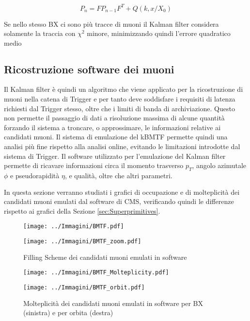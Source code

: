 \begin{equation}
  \label{eq:covariance}
  P_n = FP_{n-1}F^T + Q(k, x/X_0)
\end{equation}

Se nello stesso BX ci sono più tracce di muoni il Kalman filter considera solamente la traccia con $\chi^2$ minore, minimizzando quindi l'errore quadratico medio \cite{Summers:2728522}

\subsection{Ricostruzione software dei muoni}

Il Kalman filter è quindi un algoritmo che viene applicato per la ricostruzione di muoni nella catena di Trigger e per tanto deve soddisfare i requisiti di latenza richiesti dal Trigger stesso, oltre che i limiti di banda di archiviazione. Questo non permette il passaggio di dati a risoluzione massima di alcune quantità forzando il sistema a troncare, o approssimare, le informazioni relative ai candidati muoni. Il sistema di emulazione del kBMTF permette quindi una analisi più fine rispetto alla analisi online, evitando le limitazioni introdotte dal sistema di Trigger. Il software utilizzato per l'emulazione del Kalman filter permette di ricavare informazioni circa il momento trasverso $p_T$, angolo azimutale $\phi$ e pseudorapidità $\eta$, e qualità, oltre che altri parametri.

In questa sezione verranno studiati i grafici di occupazione e di molteplicità dei candidati muoni emulati dal software di CMS, verificando quindi le differenze rispetto ai grafici della Sezione \ref{sec:Superprimitives}.



\begin{figure}[t]
  \centering
  \begin{minipage}[b]{0.49\textwidth}
      \centering
      \texttt{[image: ../Immagini/BMTF.pdf]} 
    \end{minipage}
    \hfill 
    \begin{minipage}[b]{0.49\textwidth}
      \centering
      \texttt{[image: ../Immagini/BMTF\_zoom.pdf]} 
    \end{minipage}
    \caption{Filling Scheme dei candidati muoni emulati in software }
  \label{fig:BMTFMuons}
\end{figure}

\begin{figure}[t]
  \centering
  \begin{minipage}[b]{0.49\textwidth}
      \centering
      \texttt{[image: ../Immagini/BMTF\_Molteplicity.pdf]} 
    \end{minipage}
    \hfill 
    \begin{minipage}[b]{0.49\textwidth}
      \centering
      \texttt{[image: ../Immagini/BMTF\_orbit.pdf]} 
    \end{minipage}
    \caption{Molteplicità dei candidati muoni emulati in software per BX (sinistra) e per orbita (destra)}
  \label{fig:BMTFMolteplicity}
\end{figure}


